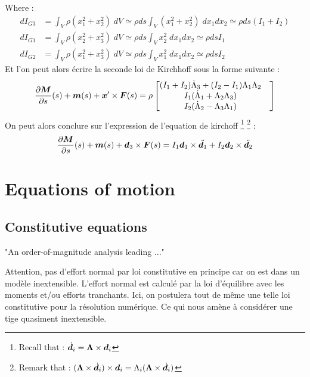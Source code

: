 Where :
\begin{subequations}
	\begin{align}
		dI_{G3} &= \int_V \rho (x_1^2+ x_2^2)\;dV
		\simeq \rho ds \int_V (x_1^2+x_2^2)\;dx_1dx_2
		\simeq \rho ds (I_1 + I_2)
		\\
		dI_{G1} &= \int_V \rho (x_2^2+ x_3^2)\;dV
		\simeq \rho ds \int_V x_2^2\;dx_1dx_2
		\simeq \rho ds I_1
		\\
		dI_{G2} &= \int_V \rho (x_1^2+ x_3^2)\;dV
		\simeq \rho ds \int_V x_1^2\;dx_1dx_2
		\simeq \rho ds I_2
	\end{align}
\end{subequations}
Et l'on peut alors écrire la seconde loi de Kirchhoff sous la forme suivante :
\begin{equation}
	\begin{aligned}
		\frac{\partial \boldsymbol{M}}{\partial s}(s)+\boldsymbol{m}(s) + \boldsymbol{x}'\times \boldsymbol{F}(s)
		= \rho
			\begin{bmatrix}
				(I_1 + I_2)\dot{\Lambda}_3 + (I_2 - I_1)\Lambda_1\Lambda_2&\\
				I_1 (\dot{\Lambda}_1 + \Lambda_2 \Lambda_3) &\\
				I_2 (\dot{\Lambda}_2 - \Lambda_3 \Lambda_1) &
			\end{bmatrix}
	\end{aligned}
\end{equation}
On peut alors conclure sur l'expression de l'equation de kirchoff
\footnote{Recall that : $\dot{\boldsymbol{d}_i} = \boldsymbol{\Lambda} \times \boldsymbol{d}_i$}
\footnote{Remark that : $(\boldsymbol{\Lambda}\times\dot{\boldsymbol{d}_i})\times\boldsymbol{d}_i = \Lambda_i(\boldsymbol{\Lambda}\times\dot{\boldsymbol{d}_i})$} :
\begin{equation}
	\frac{\partial \boldsymbol{M}}{\partial s}(s)+\boldsymbol{m}(s) + \boldsymbol{d}_3 \times \boldsymbol{F}(s) = I_1 \boldsymbol{d}_1 \times \ddot{\boldsymbol{d}_1} + I_2 \boldsymbol{d}_2 \times \ddot{\boldsymbol{d}_2}
\end{equation}

\section{Equations of motion}
\subsection{Constitutive equations}

"An order-of-magnitude analysis leading ..."

Attention, pas d'effort normal par loi constitutive en principe car on est dans un modèle inextensible.
L'effort normal est calculé par la loi d'équilibre avec les moments et/ou efforts tranchants.
Ici, on postulera tout de même une telle loi constitutive pour la résolution numérique. Ce qui nous amène à considérer une tige quasiment inextensible.

